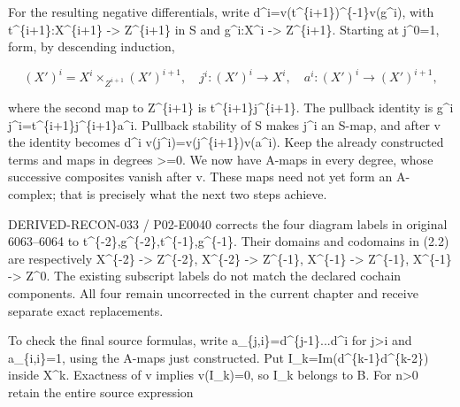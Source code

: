 \documentclass[11pt]{article}
\begin{document}
For the resulting negative differentials,\allowbreak{} write d\textasciicircum{}i\allowbreak{}=v(t\textasciicircum{}\{i\allowbreak{}+1\})\allowbreak{}\textasciicircum{}\{-1\}v(g\textasciicircum{}i)\allowbreak{},\allowbreak{} with t\textasciicircum{}\{i\allowbreak{}+1\}:\allowbreak{}X\textasciicircum{}\{i\allowbreak{}+1\} \allowbreak{}-> Z\textasciicircum{}\{i\allowbreak{}+1\} in S and g\textasciicircum{}i:\allowbreak{}X\textasciicircum{}i \allowbreak{}-> Z\textasciicircum{}\{i\allowbreak{}+1\}. Starting at j\textasciicircum{}0\allowbreak{}=1,\allowbreak{} form,\allowbreak{} by descending induction,\allowbreak{}

\[
 (X')^i=X^i\mathbin{\times}_{Z^{i+1}}(X')^{i+1},\quad
 j^i:(X')^i\longrightarrow X^i,\quad
 a^i:(X')^i\longrightarrow (X')^{i+1},                    \tag{2.2}
\]

where the second map to Z\textasciicircum{}\{i\allowbreak{}+1\} is t\textasciicircum{}\{i\allowbreak{}+1\}j\textasciicircum{}\{i\allowbreak{}+1\}. The pullback identity is g\^{}i j\textasciicircum{}i\allowbreak{}=t\textasciicircum{}\{i\allowbreak{}+1\}j\textasciicircum{}\{i\allowbreak{}+1\}a\textasciicircum{}i. Pullback stability of S makes j\^{}i an S-map,\allowbreak{} and after v the identity becomes d\^{}i v(j\textasciicircum{}i)\allowbreak{}\allowbreak{}=v(j\textasciicircum{}\{i\allowbreak{}+1\})\allowbreak{}v(a\textasciicircum{}i)\allowbreak{}. Keep the already constructed terms and maps in degrees >\allowbreak{}=0. We now have A-maps in every degree,\allowbreak{} whose successive composites vanish after v. These maps need not yet form an A-complex; that is precisely what the next two steps achieve.

DERIVED-RECON-033 /\allowbreak{} P02-E0040 corrects the four diagram labels in original 6063–\allowbreak{}6064 to t\textasciicircum{}\{-2\},\allowbreak{}g\textasciicircum{}\{-2\},\allowbreak{}t\textasciicircum{}\{-1\},\allowbreak{}g\textasciicircum{}\{-1\}. Their domains and codomains in (2.2)\allowbreak{} are respectively X\^{}\{-2\} \allowbreak{}-> Z\textasciicircum{}\{-2\},\allowbreak{} X\^{}\{-2\} \allowbreak{}-> Z\textasciicircum{}\{-1\},\allowbreak{} X\^{}\{-1\} \allowbreak{}-> Z\textasciicircum{}\{-1\},\allowbreak{} X\^{}\{-1\} \allowbreak{}-> Z\^{}0. The existing subscript labels do not match the declared cochain components. All four remain uncorrected in the current chapter and receive separate exact replacements.

To check the final source formulas,\allowbreak{} write a\_\allowbreak{}\{j,\allowbreak{}i\}\allowbreak{}=d\textasciicircum{}\{j-1\}...d\textasciicircum{}i for j\textgreater i and a\_\allowbreak{}\{i,\allowbreak{}i\}\allowbreak{}=1,\allowbreak{} using the A-maps just constructed. Put I\_\allowbreak{}k\allowbreak{}=Im(d\textasciicircum{}\{k-1\}d\textasciicircum{}\{k-2\})\allowbreak{} inside X\^{}k. Exactness of v implies v(I\_\allowbreak{}k)\allowbreak{}\allowbreak{}=0,\allowbreak{} so I\_\allowbreak{}k belongs to B. For n\textgreater0 retain the entire source expression
\end{document}
